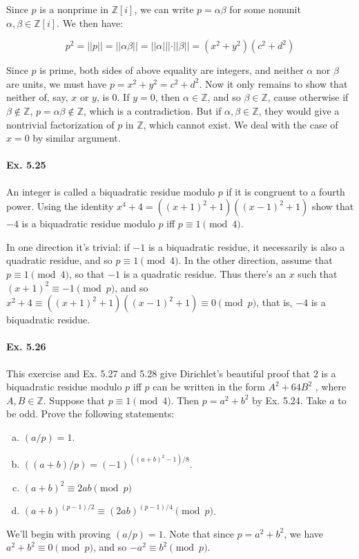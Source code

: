 \documentclass[notitlepage]{article}
\theoremstyle{definition}
\newcommand\Z{\mathbb{Z}}
\begin{document}
Since $p$ is a nonprime in $\Z[i]$, we can write $p = \alpha \beta$
for some nonunit $\alpha, \beta \in \Z[i]$. We then have:

\begin{equation}
  p^2 = ||p|| = ||\alpha \beta|| = ||\alpha|||\cdot||\beta|| = (x^2 + y^2)(c^2 + d^2)
\end{equation}

Since $p$ is prime, both sides of above equality are integers, and
neither $\alpha$ nor $\beta$ are units, we must have $p = x^2 + y^2 =
c^2 + d^2$. Now it only remains to show that neither of, say, $x$ or
$y$, is $0$. If $y = 0$, then $\alpha \in \Z$, and so $\beta \in \Z$,
cause otherwise if $\beta \not \in \Z$, $p = \alpha \beta \not \in
\Z$, which is a contradiction. But if $\alpha, \beta \in \Z$, they
would give a nontrivial factorization of $p$ in $\Z$, which cannot
exist. We deal with the case of $x = 0$ by similar argument.

\paragraph{Ex. 5.25}
An integer is called a biquadratic residue modulo $p$ if it is
congruent to a fourth power. Using the identity $x^4 + 4 = ((x + 1)^2
+ 1)((x - 1)^2 + 1)$ show that $-4$ is a biquadratic residue modulo $p$
iff $p \equiv 1 \pmod 4$.

In one direction it's trivial: if $-1$ is a biquadratic residue, it
necessarily is also a quadratic residue, and so $p \equiv 1 \pmod
4$. In the other direction, assume that $p \equiv 1 \pmod 4$, so that
$-1$ is a quadratic residue. Thus there's an $x$ such that $(x+1)^2
\equiv -1 \pmod p$, and so $x^2 + 4 \equiv ((x+1)^2 + 1)((x-1)^2 + 1)
\equiv 0 \pmod p$, that is, $-4$ is a biquadratic residue.

\paragraph{Ex. 5.26}
This exercise and Ex. 5.27 and 5.28 give Dirichlet's beautiful proof
that $2$ is a biquadratic residue modulo $p$ iff $p$ can be written in
the form $A^2 + 64B^2$ , where $A, B \in \Z$. Suppose that $p \equiv 1
\pmod 4$. Then $p = a^2 + b^2$ by Ex. 5.24. Take $a$ to be odd.  Prove
the following statements:

\begin{enumerate}[a)]
\item $(a/p) = 1$.
\item $((a + b)/p) = (-1)^{((a+b)^2 -1)/8}$.
\item $(a + b)^2 \equiv 2ab \pmod p$
\item $(a + b)^{(p- 1)/2} \equiv (2ab)^{(p- 1)/4} \pmod p$.
\end{enumerate}

We'll begin with proving $(a/p) = 1$. Note that since $p = a^2 + b^2$,
we have $a^2 + b^2 \equiv 0 \pmod p$, and so $-a^2 \equiv b^2 \pmod p$. 
\end{document}
